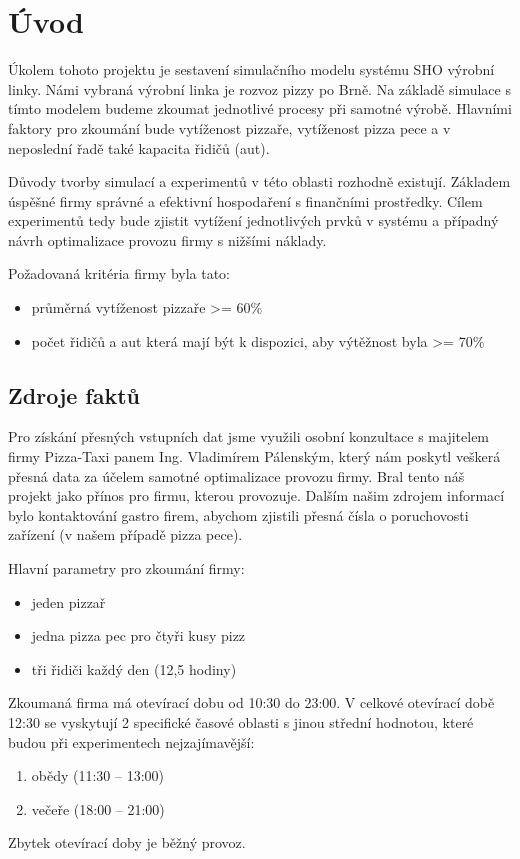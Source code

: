 \documentclass[a4paper, 12pt]{article}[9.12.2013]
\begin{document}


\section{Úvod} \label{uvod}
Úkolem tohoto projektu je sestavení simulačního modelu systému SHO výrobní
linky. Námi vybraná výrobní linka je rozvoz pizzy po Brně. Na základě simulace
s tímto modelem budeme zkoumat jednotlivé procesy při samotné výrobě. Hlavními
faktory pro zkoumání bude vytíženost pizzaře, vytíženost pizza pece a v
neposlední řadě také kapacita řidičů (aut).

Důvody tvorby simulací a experimentů v této oblasti rozhodně existují. Základem
úspěšné firmy správné a efektivní hospodaření s finančními prostředky. Cílem
experimentů tedy bude zjistit vytížení jednotlivých prvků v systému
a případný návrh optimalizace provozu firmy s nižšími náklady.

Požadovaná kritéria firmy byla tato:
\begin{itemize}
\item průměrná vytíženost pizzaře >= 60\%
\item počet řidičů a aut která mají být k dispozici, aby výtěžnost byla >= 70\%
\end{itemize}

\subsection{Zdroje faktů} \label{uvod:zdroje}
Pro získání přesných vstupních dat jsme využili osobní konzultace s majitelem
firmy Pizza-Taxi panem Ing. Vladimírem Pálenským, který nám poskytl veškerá
přesná data za účelem samotné optimalizace provozu firmy. Bral tento náš
projekt jako přínos pro firmu, kterou provozuje. Dalším našim zdrojem informací
bylo kontaktování gastro firem, abychom zjistili přesná čísla o poruchovosti
zařízení (v našem případě pizza pece).

Hlavní parametry pro zkoumání firmy:
\begin{itemize}
    \item jeden pizzař
    \item jedna pizza pec pro čtyři kusy pizz
    \item tři řidiči každý den (12,5 hodiny)
\end{itemize}

Zkoumaná firma má otevírací dobu od 10:30 do 23:00. V celkové otevírací době
12:30 se vyskytují 2 specifické časové oblasti s jinou střední hodnotou, které
budou při experimentech nejzajímavější:
\begin{enumerate}
    \item obědy (11:30 – 13:00)
    \item večeře (18:00 – 21:00)
\end{enumerate}
Zbytek otevírací doby je běžný provoz.
\end{document}
